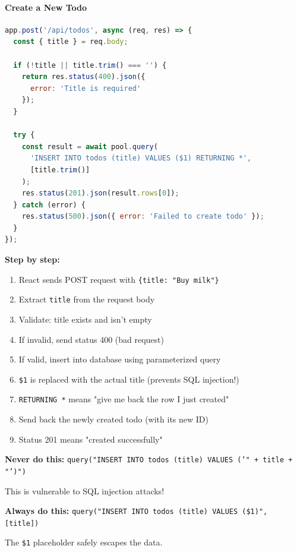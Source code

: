 \documentclass[12pt,a4paper]{article}
\begin{document}
\paragraph{Create a New Todo}

\begin{lstlisting}[language=JavaScript, caption=POST New Todo]
app.post('/api/todos', async (req, res) => {
  const { title } = req.body;
  
  if (!title || title.trim() === '') {
    return res.status(400).json({ 
      error: 'Title is required' 
    });
  }
  
  try {
    const result = await pool.query(
      'INSERT INTO todos (title) VALUES ($1) RETURNING *',
      [title.trim()]
    );
    res.status(201).json(result.rows[0]);
  } catch (error) {
    res.status(500).json({ error: 'Failed to create todo' });
  }
});
\end{lstlisting}

\textbf{Step by step:}
\begin{enumerate}
    \item React sends POST request with \texttt{\{title: "Buy milk"\}}
    \item Extract \texttt{title} from the request body
    \item Validate: title exists and isn't empty
    \item If invalid, send status 400 (bad request)
    \item If valid, insert into database using parameterized query
    \item \texttt{\$1} is replaced with the actual title (prevents SQL injection!)
    \item \texttt{RETURNING *} means "give me back the row I just created"
    \item Send back the newly created todo (with its new ID)
    \item Status 201 means "created successfully"
\end{enumerate}

\begin{tcolorbox}[colback=red!5!white,colframe=red!75!black,title=Security: SQL Injection Prevention]
\textbf{Never do this:}
\texttt{query("INSERT INTO todos (title) VALUES ('" + title + "')")}

This is vulnerable to SQL injection attacks!

\textbf{Always do this:}
\texttt{query("INSERT INTO todos (title) VALUES (\$1)", [title])}

The \texttt{\$1} placeholder safely escapes the data.
\end{tcolorbox}
\end{document}
